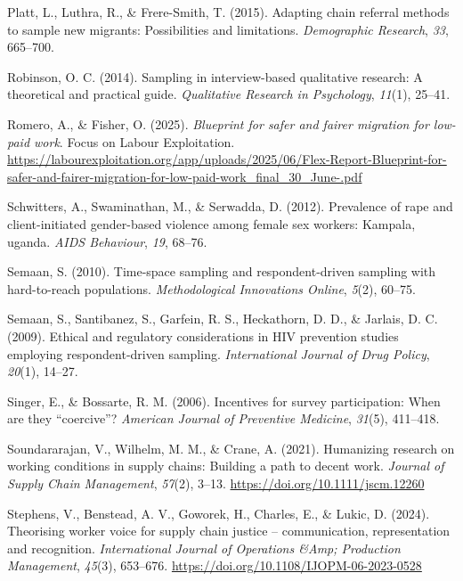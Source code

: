\documentclass[
  12pt,
]{article}
\newlength{\cslhangindent}
\newenvironment{CSLReferences}[2] %
 {\begin{list}{}{%
  \setlength{\itemindent}{0pt}
  \setlength{\leftmargin}{0pt}
  \setlength{\parsep}{0pt}
  \ifodd #1
   \setlength{\leftmargin}{\cslhangindent}
   \setlength{\itemindent}{-1\cslhangindent}
  \fi
  \setlength{\itemsep}{#2\baselineskip}}}
 {\end{list}}
\theoremstyle{plain}
\theoremstyle{definition}
\begin{document}
\begin{CSLReferences}{1}{0}
Platt, L., Luthra, R., \& Frere-Smith, T. (2015). Adapting chain
referral methods to sample new migrants: Possibilities and limitations.
\emph{Demographic Research}, \emph{33}, 665--700.

Robinson, O. C. (2014). Sampling in interview-based qualitative
research: A theoretical and practical guide. \emph{Qualitative Research
in Psychology}, \emph{11}(1), 25--41.

Romero, A., \& Fisher, O. (2025). \emph{Blueprint for safer and fairer
migration for low-paid work}. Focus on Labour Exploitation.
\url{https://labourexploitation.org/app/uploads/2025/06/Flex-Report-Blueprint-for-safer-and-fairer-migration-for-low-paid-work_final_30_June-.pdf}

Schwitters, A., Swaminathan, M., \& Serwadda, D. (2012). Prevalence of
rape and client-initiated gender-based violence among female sex
workers: Kampala, uganda. \emph{{AIDS} Behaviour}, \emph{19}, 68--76.

Semaan, S. (2010). Time-space sampling and respondent-driven sampling
with hard-to-reach populations. \emph{Methodological Innovations
Online}, \emph{5}(2), 60--75.

Semaan, S., Santibanez, S., Garfein, R. S., Heckathorn, D. D., \&
Jarlais, D. C. (2009). Ethical and regulatory considerations in {HIV}
prevention studies employing respondent-driven sampling.
\emph{International Journal of Drug Policy}, \emph{20}(1), 14--27.

Singer, E., \& Bossarte, R. M. (2006). Incentives for survey
participation: When are they {``coercive''}? \emph{American Journal of
Preventive Medicine}, \emph{31}(5), 411--418.

Soundararajan, V., Wilhelm, M. M., \& Crane, A. (2021). Humanizing
research on working conditions in supply chains: Building a path to
decent work. \emph{Journal of Supply Chain Management}, \emph{57}(2),
3--13. \url{https://doi.org/10.1111/jscm.12260}

Stephens, V., Benstead, A. V., Goworek, H., Charles, E., \& Lukic, D.
(2024). Theorising worker voice for supply chain justice --
communication, representation and recognition. \emph{International
Journal of Operations \&Amp; Production Management}, \emph{45}(3),
653--676. \url{https://doi.org/10.1108/IJOPM-06-2023-0528}


\end{CSLReferences}
\end{document}
